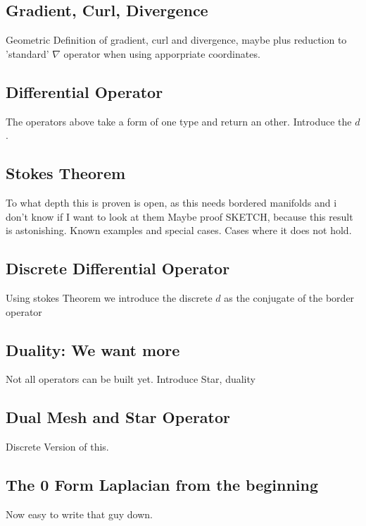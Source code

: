 \documentclass[]{scrbook}
\begin{document}
	\subsection{Gradient, Curl, Divergence}
		Geometric Definition of gradient, curl and divergence, maybe plus reduction to 'standard' $\nabla$ operator when using apporpriate coordinates.
	\subsection{Differential Operator}
		The operators above take a form of one type and return an other.
		Introduce the $d$.
	\subsection{Stokes Theorem}
		To what depth this is proven is open, as this needs bordered manifolds and i don't know if I want to look at them
		Maybe proof SKETCH, because this result is astonishing.
		Known examples and special cases. Cases where it does not hold.
	\subsection{Discrete Differential Operator}
		Using stokes Theorem we introduce the discrete $d$ as the conjugate of the border operator
	\subsection{Duality: We want more}
		Not all operators can be built yet. Introduce Star, duality
	\subsection{Dual Mesh and Star Operator}
		Discrete Version of this.
	\subsection{The 0 Form Laplacian from the beginning}
		Now easy to write that guy down.
\newpage		
\end{document}
